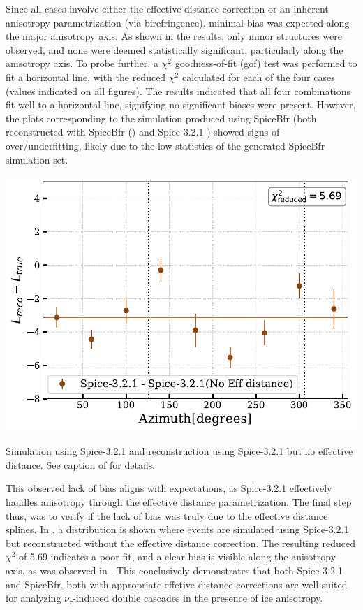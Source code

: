 Since all cases involve either the effective distance correction or an inherent anisotropy parametrization (via birefringence), minimal bias was expected along the major anisotropy axis. As shown in the results, only minor structures were observed, and none were deemed statistically significant, particularly along the anisotropy axis. To probe further, a $\chi^2$ goodness-of-fit (gof) test was performed to fit a horizontal line, with the reduced $\chi^2$ calculated for each of the four cases (values indicated on all figures). The results indicated that all four combinations fit well to a horizontal line, signifying no significant biases were present. However, the plots corresponding to the simulation produced using SpiceBfr (both reconstructed with SpiceBfr () and Spice-3.2.1 ) showed signs of over/underfitting, likely due to the low statistics of the generated SpiceBfr simulation set. 
\begin{marginfigure}
    
    \includegraphics{./figures/EventSample/Lbias_spicenoeffdist.pdf}
    \caption{Simulation using Spice-3.2.1 and reconstruction using Spice-3.2.1 but no effective distance. See caption of  for details.}
\end{marginfigure}
This observed lack of bias aligns with expectations, as Spice-3.2.1 effectively handles anisotropy through the effective distance parametrization. The final step thus, was to verify if the lack of bias was truly due to the effective distance splines. In , a distribution is shown where events are simulated using Spice-3.2.1 but reconstructed without the effective distance correction. The resulting reduced $\chi^2$ of 5.69 indicates a poor fit, and a clear bias is visible along the anisotropy axis, as was observed in \cite{marcel_thesis}. This conclusively demonstrates that both Spice-3.2.1 and SpiceBfr, both with appropriate effetive distance corrections are well-suited for analyzing $\nu_{\tau}$-induced double cascades in the presence of ice anisotropy.

